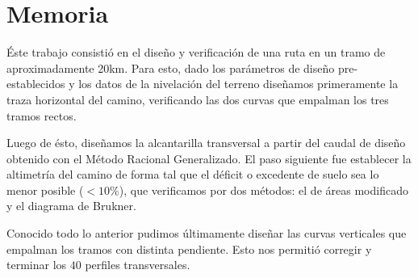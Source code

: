 \documentclass[../main.tex]{subfiles}
\begin{document}
\section{Memoria}

Éste trabajo consistió en el diseño y verificación de una ruta en un tramo de aproximadamente 20km. Para esto, dado los parámetros de diseño pre-establecidos y los datos de la nivelación del terreno diseñamos primeramente la traza horizontal del camino, verificando las dos curvas que empalman los tres tramos rectos. \cite{cornero_planimetria}

Luego de ésto, diseñamos la alcantarilla transversal a partir del caudal de diseño obtenido con el Método Racional Generalizado.\cite{metodo_racional} El paso siguiente fue establecer la altimetría del camino de forma tal que el déficit o excedente de suelo sea lo menor posible ($<10\%$), que verificamos por dos métodos: el de áreas modificado y el diagrama de Brukner. \cite{presentaciones} \cite{cornero_altimetria}

Conocido todo lo anterior pudimos últimamente diseñar las curvas verticales que empalman los tramos con distinta pendiente. Esto nos permitió corregir y terminar los $40$ perfiles transversales. 
\end{document}
